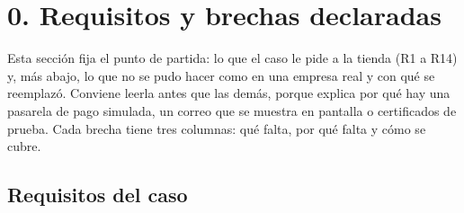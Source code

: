 
\section{0. Requisitos y brechas declaradas}

Esta sección fija el punto de partida: lo que el caso le pide a la tienda (R1 a R14) y, más abajo, lo que no se pudo hacer como en una empresa real y con qué se reemplazó. Conviene leerla antes que las demás, porque explica por qué hay una pasarela de pago simulada, un correo que se muestra en pantalla o certificados de prueba. Cada brecha tiene tres columnas: qué falta, por qué falta y cómo se cubre.


\subsection{Requisitos del caso}

